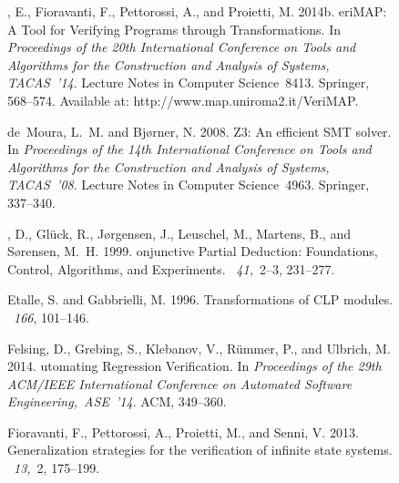 \documentclass[english]{tlp}
\begin{document}
\begin{figure}[ht]
\begin{flushleft}
\begin{minipage}{124mm}
\begin{thebibliography}{}
{, E.}, {\sc Fioravanti, F.}, {\sc Pettorossi, A.}, {\sc and}
  {\sc Proietti, M.} 2014b.
eri{MAP}: {A} {T}ool for {V}erifying {P}rograms through
  {T}ransformations.
\newblock In {\em Proceedings of the 20th International Conference on Tools and
  Algorithms for the Construction and Analysis of Systems, TACAS~'14}. Lecture
  Notes in Computer Science~8413. Springer, 568--574.
\newblock Available at: {\rm http://www.map.uniroma2.it/VeriMAP}.

{\sc de~Moura, L.~M.} {\sc and} {\sc Bj{\o}rner, N.} 2008.
\newblock Z3: {A}n efficient {SMT} solver.
\newblock In {\em Proceedings of the 14th International Conference on Tools and
  Algorithms for the Construction and Analysis of Systems, {TACAS}~'08}.
  Lecture Notes in Computer Science~4963. Springer, 337--340.

{, D.}, {\sc Gl{\"u}ck, R.}, {\sc J{\o}rgensen, J.}, {\sc
  Leuschel, M.}, {\sc Martens, B.}, {\sc and} {\sc S{\o}rensen, M.~H.} 1999.
onjunctive {P}artial {D}eduction: {F}oundations, {C}ontrol,
  {A}lgorithms, and {E}xperiments.
~{\em 41,\/}~2--3, 231--277.

{\sc Etalle, S.} {\sc and} {\sc Gabbrielli, M.} 1996.
\newblock Trans\-form\-ations of {CLP} modules.
~{\em 166}, 101--146.

{\sc Felsing, D.}, {\sc Grebing, S.}, {\sc Klebanov, V.}, {\sc R\"{u}mmer, P.}, {\sc and}
  {\sc Ulbrich, M.} 2014.
utomating {R}egression {V}erification.
\newblock In {\em Proceedings of the 29th {ACM/IEEE} {I}nternational {C}onference on  {A}utomated {S}oftware {E}ngineering,~ASE~'14}. {ACM}, 349--360.

{\sc Fioravanti, F.}, {\sc Pettorossi, A.}, {\sc Proietti, M.}, {\sc and} {\sc
  Senni, V.} 2013.
\newblock Generalization strategies for the verification of infinite state
  systems.
~{\em 13,\/}~2, 175--199.


\end{thebibliography}
\end{minipage}
\end{flushleft}
\end{figure}
\end{document}

